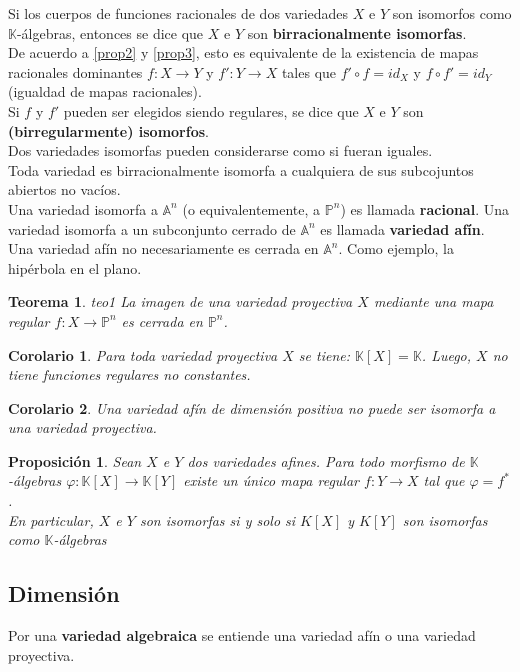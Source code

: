 \documentclass[12pt,a4paper]{report}
\newcommand{\ea}{\mathbb{A}^{n}}
\newcommand{\ep}{\mathbb{P}^{n}}
\newcommand{\K}{\mathbb{K}}
\newtheorem{teo}{Teorema}[chapter]
\newtheorem{cor}{Corolario}[chapter]
\newtheorem{prop}{Proposición}[chapter]
\begin{document}
Si los cuerpos de funciones racionales de dos variedades $X$ e $Y$ son isomorfos como $\K$-álgebras, entonces se dice que $X$ e $Y$ son \textbf{birracionalmente isomorfas}. \\
De acuerdo a \ref{prop2} y \ref{prop3}, esto es equivalente de la existencia de mapas racionales dominantes $f:X \rightarrow Y $ y $f' : Y \rightarrow X$  tales que $ f' \circ f = id_{X} $ y $f \circ f' = id_{Y}$ (igualdad de mapas racionales).\\
Si $f$ y $f'$ pueden ser elegidos siendo regulares, se dice que $X$ e $Y$ son \textbf{(birregularmente) isomorfos}. \\
Dos variedades isomorfas pueden considerarse como si fueran iguales.\\
Toda variedad es birracionalmente isomorfa a cualquiera de sus subcojuntos abiertos no vacíos.\\

Una variedad isomorfa a $\ea$ (o equivalentemente, a $\ep$) es llamada \textbf{racional}. Una variedad isomorfa a un subconjunto cerrado de $\ea$ es llamada \textbf{variedad afín}.\\
Una variedad afín no necesariamente es cerrada en $\ea$. Como ejemplo, la hipérbola en el plano.\\

\begin{teo}{teo1}
	La imagen de una variedad proyectiva $X$ mediante una mapa regular $f:X \rightarrow \ep$ es cerrada en $\ep$.
\end{teo}

\begin{cor}
	Para toda variedad proyectiva $X$ se tiene: $ \K[X] = \K $. Luego, $X$ no tiene funciones regulares no constantes.
\end{cor}

\begin{cor}
	Una variedad afín de dimensión positiva no puede ser isomorfa a una variedad proyectiva.
\end{cor}

\begin{prop}
	Sean $X$ e $Y$ dos variedades afines. Para todo morfismo de $\K$-álgebras $\varphi : \K[X] \rightarrow \K[Y]$ existe un único mapa regular $f: Y \rightarrow X$ tal que $\varphi = f^{*}$.\\
	En particular, $X$ e $Y$ son isomorfas si y solo si $K[X]$ y $K[Y]$ son isomorfas como $\K$-álgebras
\end{prop}


\subsection{Dimensión}
Por una \textbf{variedad algebraica} se entiende una variedad afín o una variedad {proyectiva}.\\
\end{document}
